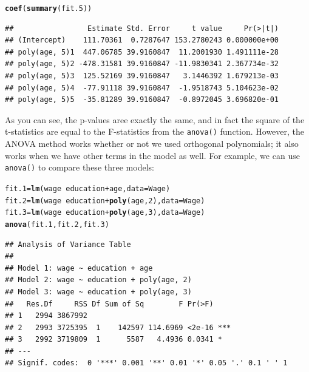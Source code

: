 \documentclass[12pt]{article}\usepackage[]{graphicx}\usepackage[]{color}
\makeatletter
\newcommand{\hlnum}[1]{\textcolor[rgb]{0.686,0.059,0.569}{#1}}%
\newcommand{\hlopt}[1]{\textcolor[rgb]{0,0,0}{#1}}%
\newcommand{\hlstd}[1]{\textcolor[rgb]{0.345,0.345,0.345}{#1}}%
\newcommand{\hlkwb}[1]{\textcolor[rgb]{0.69,0.353,0.396}{#1}}%
\newcommand{\hlkwc}[1]{\textcolor[rgb]{0.333,0.667,0.333}{#1}}%
\newcommand{\hlkwd}[1]{\textcolor[rgb]{0.737,0.353,0.396}{\textbf{#1}}}%
\newenvironment{kframe}{%
 \def\at@end@of@kframe{}%
 \ifinner\ifhmode%
  \def\at@end@of@kframe{\end{minipage}}%
  \begin{minipage}{\columnwidth}%
 \fi\fi%
 \def\FrameCommand##1{\hskip\@totalleftmargin \hskip-\fboxsep
 \colorbox{shadecolor}{##1}\hskip-\fboxsep
     \hskip-\linewidth \hskip-\@totalleftmargin \hskip\columnwidth}%
 \MakeFramed {\advance\hsize-\width
   \@totalleftmargin\z@ \linewidth\hsize
   \@setminipage}}%
 {\par\unskip\endMakeFramed%
 \at@end@of@kframe}
\newenvironment{knitrout}{}{} %
\makeatother
\begin{document}
\begin{knitrout}
\color{fgcolor}\begin{kframe}
\begin{alltt}
\hlkwd{coef}\hlstd{(}\hlkwd{summary}\hlstd{(fit.5))}
\end{alltt}
\begin{verbatim}
##                 Estimate Std. Error     t value     Pr(>|t|)
## (Intercept)    111.70361  0.7287647 153.2780243 0.000000e+00
## poly(age, 5)1  447.06785 39.9160847  11.2001930 1.491111e-28
## poly(age, 5)2 -478.31581 39.9160847 -11.9830341 2.367734e-32
## poly(age, 5)3  125.52169 39.9160847   3.1446392 1.679213e-03
## poly(age, 5)4  -77.91118 39.9160847  -1.9518743 5.104623e-02
## poly(age, 5)5  -35.81289 39.9160847  -0.8972045 3.696820e-01
\end{verbatim}
\end{kframe}
\end{knitrout}

As you can see, the p-values aree exactly the same, and in fact the square of the t-statistics are equal to the F-statistics from the \texttt{anova()} function. However, the ANOVA method works whether or not we used orthogonal polynomials; it also works when we have other terms in the model as well. For example, we can use \texttt{anova()} to compare these three models:

\begin{knitrout}
\color{fgcolor}\begin{kframe}
\begin{alltt}
\hlstd{fit.1} \hlkwb{=} \hlkwd{lm}\hlstd{(wage}\hlopt{~}\hlstd{education}\hlopt{+}\hlstd{age,} \hlkwc{data}\hlstd{=Wage)}
\hlstd{fit.2} \hlkwb{=} \hlkwd{lm}\hlstd{(wage}\hlopt{~}\hlstd{education} \hlopt{+} \hlkwd{poly}\hlstd{(age,}\hlnum{2}\hlstd{),} \hlkwc{data}\hlstd{=Wage)}
\hlstd{fit.3} \hlkwb{=} \hlkwd{lm}\hlstd{(wage}\hlopt{~}\hlstd{education}\hlopt{+}\hlkwd{poly}\hlstd{(age,}\hlnum{3}\hlstd{),} \hlkwc{data}\hlstd{=Wage)}
\hlkwd{anova}\hlstd{(fit.1, fit.2, fit.3)}
\end{alltt}
\begin{verbatim}
## Analysis of Variance Table
## 
## Model 1: wage ~ education + age
## Model 2: wage ~ education + poly(age, 2)
## Model 3: wage ~ education + poly(age, 3)
##   Res.Df     RSS Df Sum of Sq        F Pr(>F)    
## 1   2994 3867992                                 
## 2   2993 3725395  1    142597 114.6969 <2e-16 ***
## 3   2992 3719809  1      5587   4.4936 0.0341 *  
## ---
## Signif. codes:  0 '***' 0.001 '**' 0.01 '*' 0.05 '.' 0.1 ' ' 1
\end{verbatim}
\end{kframe}
\end{knitrout}
\end{document}
